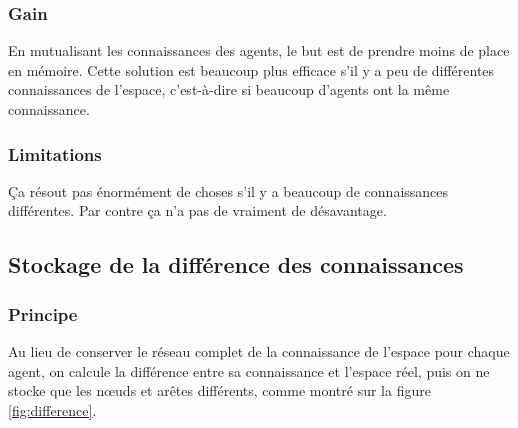 \documentclass[a4paper]{article}
\begin{document}
    \subsubsection{Gain}

En mutualisant les connaissances des agents, le but est de prendre moins de
place en mémoire. Cette solution est beaucoup plus efficace s'il y a peu de
différentes connaissances de l'espace, c'est-à-dire si beaucoup d'agents ont la
même connaissance.

    \subsubsection{Limitations}

Ça résout pas énormément de choses s'il y a beaucoup de connaissances
différentes. Par contre ça n'a pas de vraiment de désavantage.

  \subsection{Stockage de la différence des connaissances}

    \subsubsection{Principe}

Au lieu de conserver le réseau complet de la connaissance de l'espace pour
chaque agent, on calcule la différence entre sa connaissance et l'espace réel,
puis on ne stocke que les nœuds et arêtes différents, comme montré sur la figure
\ref{fig:difference}.
\end{document}
